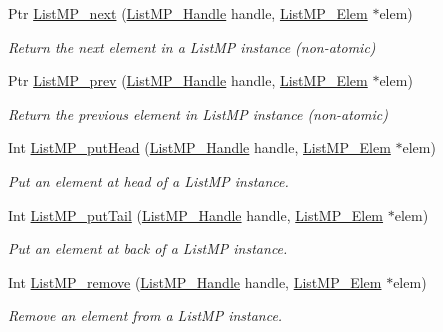 \begin{DoxyCompactItemize}
Ptr \hyperlink{_list_m_p_8h_a1c9b826d5b17a55a8ddbe231db1b8f36}{ListMP\_\-next} (\hyperlink{_list_m_p_8h_abf5a0381ce9dab133382015abaf7fe6b}{ListMP\_\-Handle} handle, \hyperlink{struct_list_m_p___elem}{ListMP\_\-Elem} $\ast$elem)
\begin{DoxyCompactList}\small\item\em Return the next element in a ListMP instance (non-\/atomic) \item\end{DoxyCompactList}\item 
Ptr \hyperlink{_list_m_p_8h_aab4e8c1ad68b0d4908ea6221b889cf14}{ListMP\_\-prev} (\hyperlink{_list_m_p_8h_abf5a0381ce9dab133382015abaf7fe6b}{ListMP\_\-Handle} handle, \hyperlink{struct_list_m_p___elem}{ListMP\_\-Elem} $\ast$elem)
\begin{DoxyCompactList}\small\item\em Return the previous element in ListMP instance (non-\/atomic) \item\end{DoxyCompactList}\item 
Int \hyperlink{_list_m_p_8h_aed19b5eadd7b9007c948c1343934e251}{ListMP\_\-putHead} (\hyperlink{_list_m_p_8h_abf5a0381ce9dab133382015abaf7fe6b}{ListMP\_\-Handle} handle, \hyperlink{struct_list_m_p___elem}{ListMP\_\-Elem} $\ast$elem)
\begin{DoxyCompactList}\small\item\em Put an element at head of a ListMP instance. \item\end{DoxyCompactList}\item 
Int \hyperlink{_list_m_p_8h_ab97d069db0de6f8116acb262989b8441}{ListMP\_\-putTail} (\hyperlink{_list_m_p_8h_abf5a0381ce9dab133382015abaf7fe6b}{ListMP\_\-Handle} handle, \hyperlink{struct_list_m_p___elem}{ListMP\_\-Elem} $\ast$elem)
\begin{DoxyCompactList}\small\item\em Put an element at back of a ListMP instance. \item\end{DoxyCompactList}\item 
Int \hyperlink{_list_m_p_8h_ab66a123f8234c4eb218fa81407c06c3c}{ListMP\_\-remove} (\hyperlink{_list_m_p_8h_abf5a0381ce9dab133382015abaf7fe6b}{ListMP\_\-Handle} handle, \hyperlink{struct_list_m_p___elem}{ListMP\_\-Elem} $\ast$elem)
\begin{DoxyCompactList}\small\item\em Remove an element from a ListMP instance. \item\end{DoxyCompactList}\end{DoxyCompactItemize}


